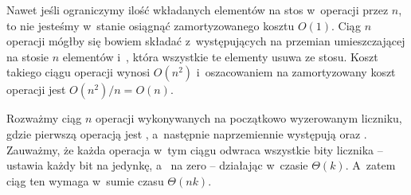 
\exercise %
Nawet jeśli ograniczymy ilość wkładanych elementów na stos w~operacji  przez $n$, to nie jesteśmy w~stanie osiągnąć zamortyzowanego kosztu $O(1)$.
Ciąg $n$ operacji mógłby się bowiem składać z~występujących na przemian  umieszczającej na stosie $n$ elementów i~, która wszystkie te elementy usuwa ze stosu.
Koszt takiego ciągu operacji wynosi $O(n^2)$ i~oszacowaniem na zamortyzowany koszt operacji jest $O(n^2)/n=O(n)$.

\exercise %
Rozważmy ciąg $n$ operacji wykonywanych na początkowo wyzerowanym liczniku, gdzie pierwszą operacją jest , a~następnie naprzemiennie występują  oraz .
Zauważmy, że każda operacja w~tym ciągu odwraca wszystkie bity licznika --  ustawia każdy bit na jedynkę, a~ na zero -- działając w~czasie $\Theta(k)$.
A~zatem ciąg ten wymaga w~sumie czasu $\Theta(nk)$.

\exercise %
